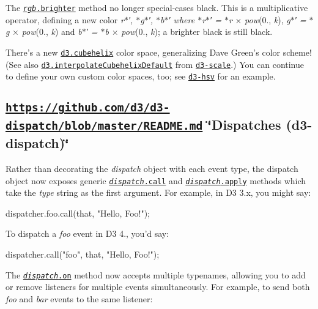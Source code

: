 The \href{https://github.com/d3/d3-color/blob/master/README.md#rgb_brighter}{\tt {\itshape rgb}.brighter} method no longer special-\/cases black. This is a multiplicative operator, defining a new color {\itshape r$\ast$′, $\ast$g$\ast$′, $\ast$b$\ast$′ where $\ast$r$\ast$′ = $\ast$r} × {\itshape pow}(0., {\itshape k}), {\itshape g$\ast$′ = $\ast$g} × {\itshape pow}(0., {\itshape k}) and {\itshape b$\ast$′ = $\ast$b} × {\itshape pow}(0., {\itshape k}); a brighter black is still black.

There’s a new \href{https://github.com/d3/d3-color/blob/master/README.md#cubehelix}{\tt d3.\+cubehelix} color space, generalizing Dave Green’s color scheme! (See also \href{https://github.com/d3/d3-scale/blob/master/README.md#interpolateCubehelixDefault}{\tt d3.\+interpolate\+Cubehelix\+Default} from \href{#scales-d3-scale}{\tt d3-\/scale}.) You can continue to define your own custom color spaces, too; see \href{https://github.com/d3/d3-hsv}{\tt d3-\/hsv} for an example.

\subsection*{\href{https://github.com/d3/d3-dispatch/blob/master/README.md}{\tt https\+://github.\+com/d3/d3-\/dispatch/blob/master/\+R\+E\+A\+D\+M\+E.\+md} \char`\"{}\+Dispatches (d3-\/dispatch)\char`\"{}}

Rather than decorating the {\itshape dispatch} object with each event type, the dispatch object now exposes generic \href{https://github.com/d3/d3-dispatch/blob/master/README.md#dispatch_call}{\tt {\itshape dispatch}.call} and \href{https://github.com/d3/d3-dispatch/blob/master/README.md#dispatch_apply}{\tt {\itshape dispatch}.apply} methods which take the {\itshape type} string as the first argument. For example, in D3 3.\+x, you might say\+:


\begin{DoxyCode}
dispatcher.foo.call(that, "Hello, Foo!");
\end{DoxyCode}


To dispatch a {\itshape foo} event in D3 4., you’d say\+:


\begin{DoxyCode}
dispatcher.call("foo", that, "Hello, Foo!");
\end{DoxyCode}


The \href{https://github.com/d3/d3-dispatch/blob/master/README.md#dispatch_on}{\tt {\itshape dispatch}.on} method now accepts multiple typenames, allowing you to add or remove listeners for multiple events simultaneously. For example, to send both {\itshape foo} and {\itshape bar} events to the same listener\+:


